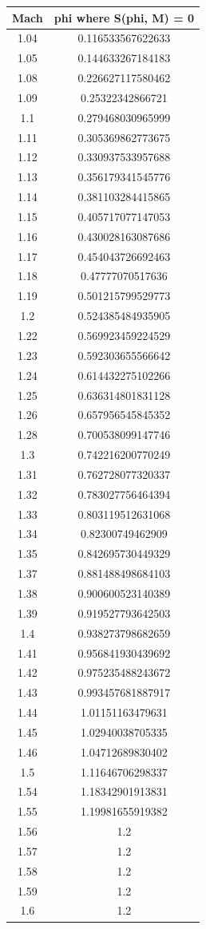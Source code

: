 \documentclass{article}
\begin{document}
\begin{tabular}{c | c}
Mach & phi where S(phi, M) = 0 \\
\hline
1.04 &  0.116533567622633\\
1.05 &  0.144633267184183\\
1.08 &  0.226627117580462\\
1.09 &  0.25322342866721\\
1.1  & 0.279468030965999\\
1.11 &  0.305369862773675\\
1.12 &  0.330937533957688\\
1.13 &  0.356179341545776\\
1.14 &  0.381103284415865\\
1.15 &  0.405717077147053\\
1.16 &  0.430028163087686\\
1.17 &  0.454043726692463\\
1.18 &  0.47777070517636\\
1.19 &  0.501215799529773\\
1.2  & 0.524385484935905\\
1.22 &  0.569923459224529\\
1.23 &  0.592303655566642\\
1.24 &  0.614432275102266\\
1.25 &  0.636314801831128\\
1.26 &  0.657956545845352\\
1.28 &  0.700538099147746\\
1.3  & 0.742216200770249\\
1.31 &  0.762728077320337\\
1.32 &  0.783027756464394\\
1.33 &  0.803119512631068\\
1.34 &  0.82300749462909\\
1.35 &  0.842695730449329\\
1.37 &  0.881488498684103\\
1.38 &  0.900600523140389\\
1.39 &  0.919527793642503\\
1.4  & 0.938273798682659\\
1.41 &  0.956841930439692\\
1.42 &  0.975235488243672\\
1.43 &  0.993457681887917\\
1.44 &  1.01151163479631\\
1.45 &  1.02940038705335\\
1.46 &  1.04712689830402\\
1.5  & 1.11646706298337\\
1.54 &  1.18342901913831\\
1.55 &  1.19981655919382\\
1.56 &  1.2\\
1.57 &  1.2\\
1.58 &  1.2\\
1.59 &  1.2\\
1.6  & 1.2\\
\hline
\end{tabular}
\end{document}
